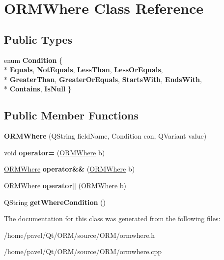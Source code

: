 \hypertarget{class_o_r_m_where}{\section{O\-R\-M\-Where Class Reference}
\label{class_o_r_m_where}
}
\subsection*{Public Types}
\begin{DoxyCompactItemize}
\item 
enum {\bfseries Condition} \{ \\*
{\bfseries Equals}, 
{\bfseries Not\-Equals}, 
{\bfseries Less\-Than}, 
{\bfseries Less\-Or\-Equals}, 
\\*
{\bfseries Greater\-Than}, 
{\bfseries Greater\-Or\-Equals}, 
{\bfseries Starts\-With}, 
{\bfseries Ends\-With}, 
\\*
{\bfseries Contains}, 
{\bfseries Is\-Null}
 \}
\end{DoxyCompactItemize}
\subsection*{Public Member Functions}
\begin{DoxyCompactItemize}
\item 
\hypertarget{class_o_r_m_where_aa4afa0f05076fb02dd6f0058c268e5a6}{{\bfseries O\-R\-M\-Where} (Q\-String field\-Name, Condition con, Q\-Variant value)}\label{class_o_r_m_where_aa4afa0f05076fb02dd6f0058c268e5a6}

\item 
\hypertarget{class_o_r_m_where_a2322a4e6ecedc637a06f2904f4bedcc8}{void {\bfseries operator=} (\hyperlink{class_o_r_m_where}{O\-R\-M\-Where} b)}\label{class_o_r_m_where_a2322a4e6ecedc637a06f2904f4bedcc8}

\item 
\hypertarget{class_o_r_m_where_a301acae1560447b35fbbf50375d5285c}{\hyperlink{class_o_r_m_where}{O\-R\-M\-Where} {\bfseries operator\&\&} (\hyperlink{class_o_r_m_where}{O\-R\-M\-Where} b)}\label{class_o_r_m_where_a301acae1560447b35fbbf50375d5285c}

\item 
\hypertarget{class_o_r_m_where_a5785105b73bbc8533c6b10fe07108402}{\hyperlink{class_o_r_m_where}{O\-R\-M\-Where} {\bfseries operator$|$$|$} (\hyperlink{class_o_r_m_where}{O\-R\-M\-Where} b)}\label{class_o_r_m_where_a5785105b73bbc8533c6b10fe07108402}

\item 
\hypertarget{class_o_r_m_where_ad235e31bfb0c824258b55da06b240ee5}{Q\-String {\bfseries get\-Where\-Condition} ()}\label{class_o_r_m_where_ad235e31bfb0c824258b55da06b240ee5}

\end{DoxyCompactItemize}


The documentation for this class was generated from the following files\-:\begin{DoxyCompactItemize}
\item 
/home/pavel/\-Qt/\-O\-R\-M/source/\-O\-R\-M/ormwhere.\-h\item 
/home/pavel/\-Qt/\-O\-R\-M/source/\-O\-R\-M/ormwhere.\-cpp\end{DoxyCompactItemize}
